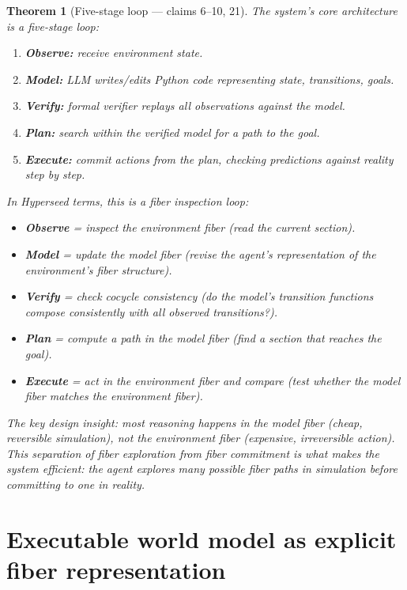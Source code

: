\documentclass[11pt,a4paper]{article}
\newtheorem{theorem}[definition]{Theorem}
\begin{document}
\begin{theorem}[Five-stage loop --- claims 6--10, 21]
\label{thm:loop}
The system's core architecture is a five-stage loop:
\begin{enumerate}
\item \textbf{Observe:} receive environment state.
\item \textbf{Model:} LLM writes/edits Python code representing
  state, transitions, goals.
\item \textbf{Verify:} formal verifier replays all observations
  against the model.
\item \textbf{Plan:} search within the verified model for a
  path to the goal.
\item \textbf{Execute:} commit actions from the plan, checking
  predictions against reality step by step.
\end{enumerate}

In Hyperseed terms, this is a \emph{fiber inspection loop}:
\begin{itemize}
\item \textbf{Observe} = inspect the environment fiber (read the
  current section).
\item \textbf{Model} = update the model fiber (revise the agent's
  representation of the environment's fiber structure).
\item \textbf{Verify} = check cocycle consistency (do the model's
  transition functions compose consistently with all observed
  transitions?).
\item \textbf{Plan} = compute a path in the model fiber (find a
  section that reaches the goal).
\item \textbf{Execute} = act in the environment fiber and compare
  (test whether the model fiber matches the environment fiber).
\end{itemize}

The key design insight: most reasoning happens in the \emph{model
fiber} (cheap, reversible simulation), not the \emph{environment
fiber} (expensive, irreversible action). This separation of fiber
exploration from fiber commitment is what makes the system efficient:
the agent explores many possible fiber paths in simulation before
committing to one in reality.
\end{theorem}

\section{Executable world model as explicit fiber representation}
\label{sec:model}
\end{document}
